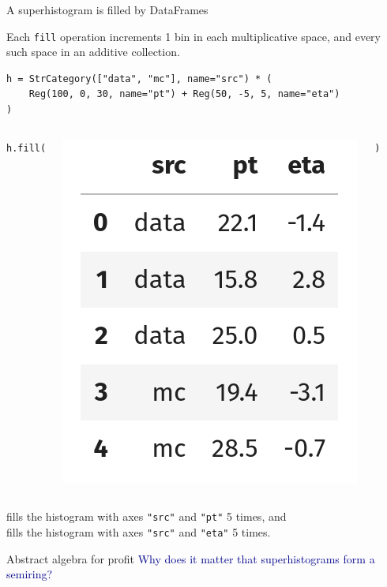 \documentclass[aspectratio=169]{beamer}
\begin{document}
\begin{frame}[fragile]{A superhistogram is filled by DataFrames}
\vspace{0.25 cm}
\large

Each \texttt{fill} operation increments 1 bin in each multiplicative space, and every such space in an additive collection.

\small
\begin{verbatim}
h = StrCategory(["data", "mc"], name="src") * (
    Reg(100, 0, 30, name="pt") + Reg(50, -5, 5, name="eta")
)
\end{verbatim}

\begin{columns}
\hfill\texttt{h.fill(}

\includegraphics[width=\linewidth]{dataframe.png}

\texttt{)}

\end{columns}

\large
\vspace{0.5 cm}
fills the histogram with axes \texttt{"src"} and \texttt{"pt"} 5 times, and \\ fills the histogram with axes \texttt{"src"} and \texttt{"eta"} 5 times.
\end{frame}

\begin{frame}{Abstract algebra for profit}
\vspace{0.5 cm}
\Large
\textcolor{darkblue}{Why does it matter that superhistograms form a semiring?}
\end{frame}

\begin{frame}{}

\end{frame}
\end{document}

